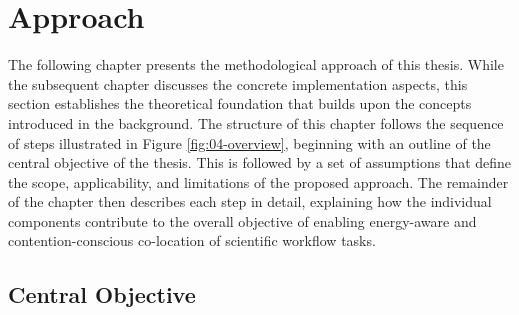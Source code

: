 \section{Approach}
\label{cha:approach}

The following chapter presents the methodological approach of this thesis. While the subsequent chapter discusses the concrete implementation aspects, this section establishes the theoretical foundation that builds upon the concepts introduced in the background. The structure of this chapter follows the sequence of steps illustrated in Figure \ref{fig:04-overview}, beginning with an outline of the central objective of the thesis. This is followed by a set of assumptions that define the scope, applicability, and limitations of the proposed approach. The remainder of the chapter then describes each step in detail, explaining how the individual components contribute to the overall objective of enabling energy-aware and contention-conscious co-location of scientific workflow tasks.

\subsection{Central Objective}
\label{sec:central_objective}

